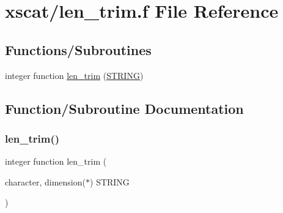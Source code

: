 \hypertarget{xscat_2len__trim_8f}{}\section{xscat/len\+\_\+trim.f File Reference}
\label{xscat_2len__trim_8f}
\subsection*{Functions/\+Subroutines}
\begin{DoxyCompactItemize}
\item 
integer function \hyperlink{xscat_2len__trim_8f_a16b24aa64df0a5da0c57510698b7ba8e}{len\+\_\+trim} (\hyperlink{eval__tab_8h_a0f4d394a3ab4e09bff60f714c66dc5ee}{S\+T\+R\+I\+NG})
\end{DoxyCompactItemize}


\subsection{Function/\+Subroutine Documentation}
\mbox{\label{xscat_2len__trim_8f_a16b24aa64df0a5da0c57510698b7ba8e}} 
\subsubsection{\texorpdfstring{len\+\_\+trim()}{len\_trim()}}
{\footnotesize\ttfamily integer function len\+\_\+trim (\begin{DoxyParamCaption}\item[{character, dimension($\ast$)}]{S\+T\+R\+I\+NG }\end{DoxyParamCaption})}

